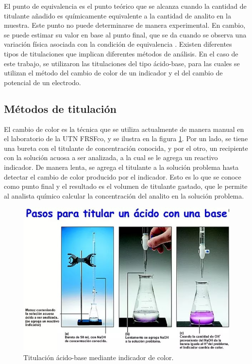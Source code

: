 El punto de equivalencia es el punto teórico que se alcanza cuando la cantidad de titulante añadido es químicamente equivalente a la cantidad de analito
en la muestra. Este punto no puede determinarse de manera experimental. En cambio, se puede estimar su valor en base al punto final, que se da cuando se observa una variación física asociada con la condición de equivalencia \citep{BOOK:1}. Existen diferentes tipos de titulaciones que implican diferentes métodos de análisis. En el caso de este trabajo, se utilizaron las titulaciones del tipo ácido-base, para las cuales se utilizan el método del cambio de color de un indicador y el del cambio de potencial de un electrodo.

\subsection{Métodos de titulación}

El cambio de color es la técnica que se utiliza actualmente de manera manual en el laboratorio  de la UTN FRSFco, y se ilustra en la figura \ref{fig:titManualColor}. Por un lado, se tiene una bureta con el titulante de concentración conocida, y por el otro, un recipiente con la solución acuosa a ser analizada, a la cual se le agrega un reactivo indicador. De manera lenta, se agrega el titulante a la solución problema hasta detectar el cambio de color producido por el indicador. Esto es lo que se conoce como punto final y el resultado es el volumen de titulante gastado, que le permite al analista químico calcular la concentración del analito en la solución problema.

\begin{figure}[htbp]
	\centering
	\includegraphics[width=.9\textwidth]{./Figures/titulacionManual.jpg}
	\caption{Titulación ácido-base mediante indicador de color\protect\footnotemark.}
	\label{fig:titManualColor}
\end{figure}

